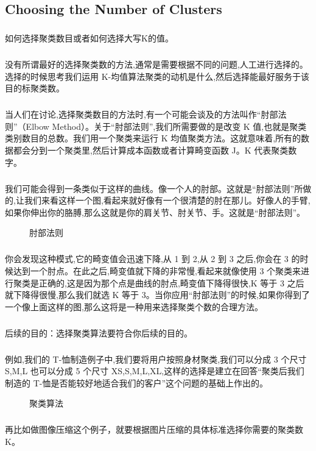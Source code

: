 \documentclass{article}
\begin{document}
\begin{CJK}{UTF8}{gbsn}
\subsection{Choosing the Number of Clusters}
\subparagraph{}
如何选择聚类数目或者如何选择大写K的值。
\subparagraph{}
没有所谓最好的选择聚类数的方法,通常是需要根据不同的问题,人工进行选择的。选择的时候思考我们运用 K-均值算法聚类的动机是什么,然后选择能最好服务于该目的标聚类数。
\subparagraph{}
当人们在讨论,选择聚类数目的方法时,有一个可能会谈及的方法叫作“肘部法则”（Elbow Method）。关于“肘部法则”,我们所需要做的是改变 K 值,也就是聚类类别数目的总数。我们用一个聚类来运行 K 均值聚类方法。这就意味着,所有的数据都会分到一个聚类里,然后计算成本函数或者计算畸变函数 J。K 代表聚类数字。
\subparagraph{}
我们可能会得到一条类似于这样的曲线。像一个人的肘部。这就是“肘部法则”所做的,让我们来看这样一个图,看起来就好像有一个很清楚的肘在那儿。好像人的手臂,如果你伸出你的胳膊,那么这就是你的肩关节、肘关节、手。这就是“肘部法则”。
\begin{figure}[H]
\label{fig:822}
\caption{肘部法则}
\end{figure}
\subparagraph{}
你会发现这种模式,它的畸变值会迅速下降,从 1 到 2,从 2 到 3 之后,你会在 3 的时候达到一个肘点。在此之后,畸变值就下降的非常慢,看起来就像使用 3 个聚类来进行聚类是正确的,这是因为那个点是曲线的肘点,畸变值下降得很快,K 等于 3 之后就下降得很慢,那么我们就选 K 等于 3。当你应用“肘部法则”的时候,如果你得到了一个像上面这样的图,那么这将是一种用来选择聚类个数的合理方法。
\begin{figure}[H]
\label{fig:821}
\end{figure}
\subparagraph{}
后续的目的：选择聚类算法要符合你后续的目的。
\subparagraph{}
例如,我们的 T-恤制造例子中,我们要将用户按照身材聚类,我们可以分成 3 个尺寸S,M,L 也可以分成 5 个尺寸 XS,S,M,L,XL,这样的选择是建立在回答“聚类后我们制造的 T-恤是否能较好地适合我们的客户”这个问题的基础上作出的。
\begin{figure}[H]
\label{fig:823}
\caption{聚类算法}
\end{figure}
\subparagraph{}
再比如做图像压缩这个例子，就要根据图片压缩的具体标准选择你需要的聚类数K。
\begin{figure}[H]
\label{fig:825}
\end{figure}
\begin{figure}[H]
\label{fig:826}
\end{figure}
\begin{figure}[H]
\label{fig:827}
\end{figure}
\begin{figure}[H]
\label{fig:828}
\end{figure}
\begin{figure}[H]
\label{fig:829}
\end{figure}

\end{CJK}
\end{document}
